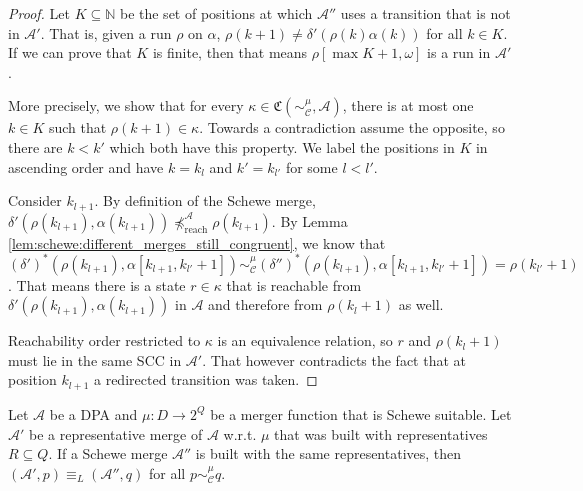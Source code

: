 \begin{proof}
	Let $K \subseteq \mathbb{N}$ be the set of positions at which $\mathcal{A}''$ uses a transition that is not in $\mathcal{A}'$. That is, given a run $\rho$ on $\alpha$, $\rho(k+1) \neq \delta'(\rho(k) \alpha(k))$ for all $k \in K$. If we can prove that $K$ is finite, then that means $\rho[\max K + 1, \omega]$ is a run in $\mathcal{A}'$.
	
	More precisely, we show that for every $\kappa \in \mathfrak{C}(\sim_\mathcal{C}^\mu, \mathcal{A})$, there is at most one $k \in K$ such that $\rho(k+1) \in \kappa$. Towards a contradiction assume the opposite, so there are $k < k'$ which both have this property. We label the positions in $K$ in ascending order and have $k = k_l$ and $k' = k_{l'}$ for some $l < l'$.
	
	Consider $k_{l+1}$. By definition of the Schewe merge, $\delta'(\rho(k_{l+1}), \alpha(k_{l+1})) \not\preceq_\text{reach}^\mathcal{A} \rho(k_{l+1})$. By Lemma \ref{lem:schewe:different_merges_still_congruent}, we know that $(\delta')^*(\rho(k_{l+1}), \alpha[k_{l+1}, k_{l'}+1]) \sim_\mathcal{C}^\mu (\delta'')^*(\rho(k_{l+1}), \alpha[k_{l+1}, k_{l'}+1]) = \rho(k_{l'}+1)$. That means there is a state $r \in \kappa$ that is reachable from $\delta'(\rho(k_{l+1}), \alpha(k_{l+1}))$ in $\mathcal{A}$ and therefore from $\rho(k_l + 1)$ as well.
	
	Reachability order restricted to $\kappa$ is an equivalence relation, so $r$ and $\rho(k_l + 1)$ must lie in the same SCC in $\mathcal{A}'$. That however contradicts the fact that at position $k_{l+1}$ a redirected transition was taken.
\end{proof}


\begin{lem}
	Let $\mathcal{A}$ be a DPA and $\mu : D \rightarrow 2^Q$ be a merger function that is Schewe suitable. Let $\mathcal{A}'$ be a representative merge of $\mathcal{A}$ w.r.t. $\mu$ that was built with representatives $R \subseteq Q$. If a Schewe merge $\mathcal{A}''$ is built with the same representatives, then $(\mathcal{A}', p) \equiv_L (\mathcal{A}'', q)$ for all $p \sim_\mathcal{C}^\mu q$.
	\label{lem:schewe:schewe_suitable_works}
\end{lem}

